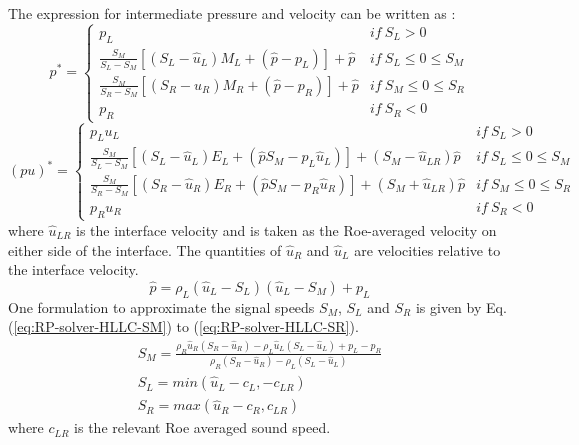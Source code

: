 \documentclass[review]{elsarticle}
\begin{document}
The expression for intermediate pressure and velocity can be written as \citep{puri2014approximate}:
\begin{equation}
p^{\ast} =  \begin{cases} 
      p_L & if \  S_L > 0 \\
      \frac{S_M}{S_L - S_M}\left [ (S_L - \hat{u}_L) M_L + (\hat{p}- p_L) \right] + \hat{p} & if \  S_L \leq 0 \leq S_M \\
      \frac{S_M}{S_R - S_M}\left [ (S_R - \hat{u}_R) M_R + (\hat{p}- p_R) \right] + \hat{p} & if \  S_M \leq 0 \leq S_R\\
      p_R & if \  S_R < 0
\end{cases}
\label{eq:RP_solver_HLLC_u}
\end{equation}
\begin{equation}
(pu)^{\ast} =  \begin{cases} 
      p_L u_L& if \  S_L > 0 \\
      \frac{S_M}{S_L - S_M}\left [ (S_L - \hat{u}_L) E_L + (\hat{p} S_M - p_L \hat{u}_L) \right] + (S_M - \hat{u}_{LR}) \hat{p} & if \  S_L \leq 0 \leq S_M \\
      \frac{S_M}{S_R - S_M}\left [ (S_R - \hat{u}_R) E_R + (\hat{p} S_M- p_R \hat{u}_R) \right] + (S_M + \hat{u}_{LR}) \hat{p} & if \ S_M \leq 0 \leq S_R\\
      p_R u_R & if \  S_R < 0
\end{cases}
\label{eq:RP_solver_HLLC_pu}
\end{equation}
where $\hat{u}_{LR}$ is the interface velocity and is taken as the Roe-averaged velocity on either side of the interface. The quantities of $\hat{u}_R$ and $\hat{u}_L$ are velocities relative to the interface velocity.
\begin{equation}
\hat{p}= \rho_L (\hat{u}_L - S_L) (\hat{u}_L - S_M) + p_L
\end{equation}
One formulation to approximate the signal speeds $S_M$, $S_L$ and $S_R$ is given by Eq. (\ref{eq:RP-solver-HLLC-SM}) to (\ref{eq:RP-solver-HLLC-SR}).
\begin{eqnarray}
S_M= \frac{\rho_R \hat{u}_R (S_R - \hat{u}_R) - \rho_L \hat{u}_L (S_L - \hat{u}_L) + p_L - p_R}{\rho_R (S_R - \hat{u}_R) - \rho_L (S_L - \hat{u}_L)} \label{eq:RP-solver-HLLC-SM} \\
S_L = min (\hat{u}_L - c_L, -c_{LR}) \label{eq:RP-solver-HLLC-SL} \\
S_R = max (\hat{u}_R - c_R, c_{LR}) \label{eq:RP-solver-HLLC-SR}
\end{eqnarray}
where $c_{LR}$ is the relevant Roe averaged sound speed.
\end{document}
